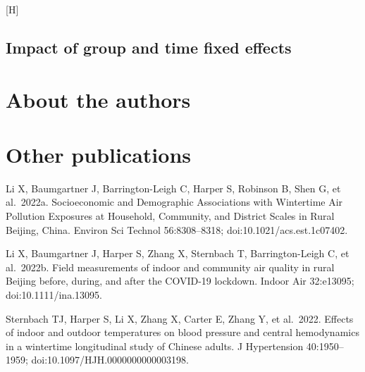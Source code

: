 \documentclass[
  letterpaper,
  DIV=11,
  numbers=noendperiod]{scrartcl}
\makeatletter
\renewenvironment{figure}%
   {\renewcommand\familydefault\sfdefault
    \@float{figure}}
   {\end@float}
\makeatother
\begin{document}
\begin{figure}[H]

\caption{\label{fig-afig-pt4}Comparison of pre-interventions trends in
blood pressure between waves 1 and 2 for never treated and villages
later treated in wave 4}


\end{figure}%

\newpage

\newpage

\subsection{Impact of group and time fixed
effects}\label{impact-of-group-and-time-fixed-effects}

\newpage

\section*{About the authors}\label{about-the-authors}

\section*{Other publications}\label{other-publications}

Li X, Baumgartner J, Barrington-Leigh C, Harper S, Robinson B, Shen G,
et al.~2022a. Socioeconomic and Demographic Associations with Wintertime
Air Pollution Exposures at Household, Community, and District Scales in
Rural Beijing, China. Environ Sci Technol 56:8308--8318;
doi:10.1021/acs.est.1c07402.

Li X, Baumgartner J, Harper S, Zhang X, Sternbach T, Barrington-Leigh C,
et al.~2022b. Field measurements of indoor and community air quality in
rural Beijing before, during, and after the COVID-19 lockdown. Indoor
Air 32:e13095; doi:10.1111/ina.13095.

Sternbach TJ, Harper S, Li X, Zhang X, Carter E, Zhang Y, et al.~2022.
Effects of indoor and outdoor temperatures on blood pressure and central
hemodynamics in a wintertime longitudinal study of Chinese adults. J
Hypertension 40:1950--1959; doi:10.1097/HJH.0000000000003198.
\end{document}
